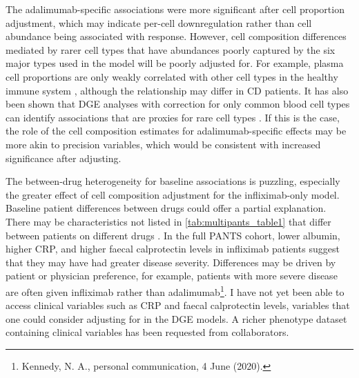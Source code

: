 The adalimumab-specific associations were more significant after cell proportion adjustment, 
which may indicate per-cell downregulation rather than cell abundance being associated with response.
However, cell composition differences mediated by rarer cell types that have abundances poorly captured by the six major types used in the model will be poorly adjusted for.
For example, plasma cell proportions are only weakly correlated with other cell types in the healthy immune system \autocite{zalocusky201810000Immunomes}, 
although the relationship may differ in \gls{CD} patients.
It has also been shown that \gls{DGE} analyses with correction for only common blood cell types can identify associations that are proxies for rare cell types \autocite{pellegrinocoppola2020CorrectionBothCommon}.
If this is the case, the role of the cell composition estimates for adalimumab-specific effects may be more akin to precision variables, 
which would be consistent with increased significance after adjusting.

The between-drug heterogeneity for baseline associations is puzzling, 
especially the greater effect of cell composition adjustment for the infliximab-only model. 
Baseline patient differences between drugs could offer a partial explanation.
There may be characteristics not listed in \cref{tab:multipants_table1} that differ between patients on different drugs \autocite{kennedy2019PredictorsAntiTNFTreatment}.
In the full \gls{PANTS} cohort, lower albumin, higher \gls{CRP}, and higher faecal calprotectin levels in infliximab patients suggest that they may have had greater disease severity.
Differences may be driven by patient or physician preference, for example, patients with more severe disease are often given infliximab rather than adalimumab\footnote{Kennedy, N. A., personal communication, 4 June (2020).}.
I have not yet been able to access clinical variables such as \gls{CRP} and faecal calprotectin levels, 
variables that one could consider adjusting for in the \gls{DGE} models.
A richer phenotype dataset containing clinical variables has been requested from collaborators.

